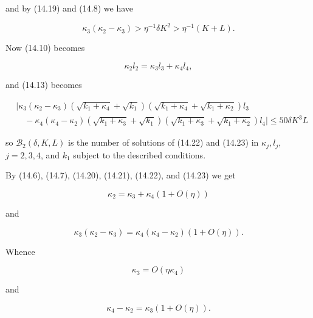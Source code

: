 \documentclass[10pt]{article}
\begin{document}
and by (14.19) and (14.8) we have


\begin{equation*}
\kappa_{3}\left(\kappa_{2}-\kappa_{3}\right)>\eta^{-1} \delta K^{2}>\eta^{-1}(K+L) . \tag{14.21}
\end{equation*}


Now (14.10) becomes


\begin{equation*}
\kappa_{2} l_{2}=\kappa_{3} l_{3}+\kappa_{4} l_{4}, \tag{14.22}
\end{equation*}


and (14.13) becomes


\begin{align*}
& \mid \kappa_{3}\left(\kappa_{2}-\kappa_{3}\right)\left(\sqrt{k_{1}+\kappa_{4}}+\sqrt{k_{1}}\right)\left(\sqrt{k_{1}+\kappa_{4}}+\sqrt{k_{1}+\kappa_{2}}\right) l_{3} \\
& \quad-\kappa_{4}\left(\kappa_{4}-\kappa_{2}\right)\left(\sqrt{k_{1}+\kappa_{3}}+\sqrt{k_{1}}\right)\left(\sqrt{k_{1}+\kappa_{3}}+\sqrt{k_{1}+\kappa_{2}}\right) l_{4} \mid \leqslant 50 \delta K^{3} L \tag{14.23}
\end{align*}


so $\mathscr{B}_{2}(\delta, K, L)$ is the number of solutions of (14.22) and (14.23) in $\kappa_{j}, l_{j}$, $j=2,3,4$, and $k_{1}$ subject to the described conditions.

By (14.6), (14.7), (14.20), (14.21), (14.22), and (14.23) we get


\begin{equation*}
\kappa_{2}=\kappa_{3}+\kappa_{4}(1+O(\eta)) \tag{14.24}
\end{equation*}


and


\begin{equation*}
\kappa_{3}\left(\kappa_{2}-\kappa_{3}\right)=\kappa_{4}\left(\kappa_{4}-\kappa_{2}\right)(1+O(\eta)) . \tag{14.25}
\end{equation*}


Whence


\begin{equation*}
\kappa_{3}=O\left(\eta \kappa_{4}\right) \tag{14.26}
\end{equation*}


and


\begin{equation*}
\kappa_{4}-\kappa_{2}=\kappa_{3}(1+O(\eta)) . \tag{14.27}
\end{equation*}
\end{document}

